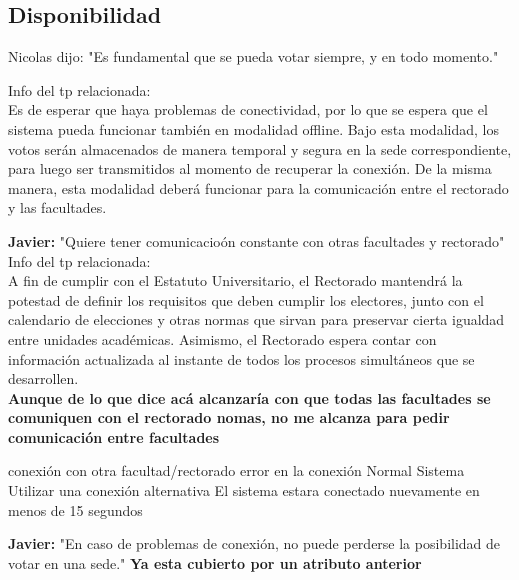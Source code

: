 \subsection{Disponibilidad}
Nicolas dijo:
"Es fundamental que se pueda votar siempre, y en todo momento."


Info del tp relacionada:
\\
Es de esperar que haya problemas de conectividad, por lo que se espera que el sistema
pueda funcionar también en modalidad offline. Bajo esta modalidad, los votos serán
almacenados de manera temporal y segura en la sede correspondiente, para luego ser
transmitidos al momento de recuperar la conexión. De la misma manera, esta modalidad
deberá funcionar para la comunicación entre el rectorado y las facultades.


\textbf{Javier:}
"Quiere tener comunicacio\'on constante con otras facultades y rectorado"
\\
Info del tp relacionada:
\\
A fin de cumplir con el Estatuto Universitario, el Rectorado mantendrá la potestad de
definir los requisitos que deben cumplir los electores, junto con el calendario de elecciones
y otras normas que sirvan para preservar cierta igualdad entre unidades académicas.
Asimismo, el Rectorado espera contar con información actualizada al instante de todos
los procesos simultáneos que se desarrollen.
\\
\textbf{Aunque de lo que dice ac\'a alcanzar\'ia con que todas las facultades se comuniquen con el rectorado nomas, no me alcanza para pedir comunicaci\'on entre facultades}


{conexi\'on con otra facultad/rectorado}
{error en la conexi\'on}
{Normal}
{Sistema}
{Utilizar una conexi\'on alternativa}
{El sistema estara conectado nuevamente en menos de 15 segundos}

\textbf{Javier:}
"En caso de problemas de conexión, no puede perderse la posibilidad de
votar en una sede."
\textbf{Ya esta cubierto por un atributo anterior}

